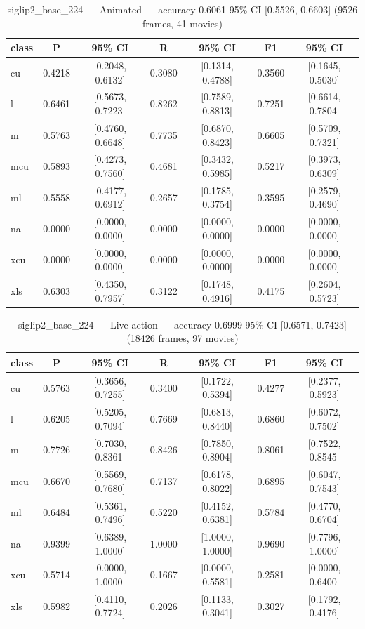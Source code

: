 \begin{table}[htbp]
\centering
\caption{siglip2\_base\_224 — Animated — accuracy 0.6061 95\% CI [0.5526, 0.6603] (9526 frames, 41 movies)}
\label{tab:siglip2-base-224-animated}
\begin{tabular}{lcccccc}
\toprule
class & P & 95\% CI & R & 95\% CI & F1 & 95\% CI \\
\midrule
cu & 0.4218 & [0.2048, 0.6132] & 0.3080 & [0.1314, 0.4788] & 0.3560 & [0.1645, 0.5030] \\
l & 0.6461 & [0.5673, 0.7223] & 0.8262 & [0.7589, 0.8813] & 0.7251 & [0.6614, 0.7804] \\
m & 0.5763 & [0.4760, 0.6648] & 0.7735 & [0.6870, 0.8423] & 0.6605 & [0.5709, 0.7321] \\
mcu & 0.5893 & [0.4273, 0.7560] & 0.4681 & [0.3432, 0.5985] & 0.5217 & [0.3973, 0.6309] \\
ml & 0.5558 & [0.4177, 0.6912] & 0.2657 & [0.1785, 0.3754] & 0.3595 & [0.2579, 0.4690] \\
na & 0.0000 & [0.0000, 0.0000] & 0.0000 & [0.0000, 0.0000] & 0.0000 & [0.0000, 0.0000] \\
xcu & 0.0000 & [0.0000, 0.0000] & 0.0000 & [0.0000, 0.0000] & 0.0000 & [0.0000, 0.0000] \\
xls & 0.6303 & [0.4350, 0.7957] & 0.3122 & [0.1748, 0.4916] & 0.4175 & [0.2604, 0.5723] \\
\bottomrule
\end{tabular}
\end{table}

\begin{table}[htbp]
\centering
\caption{siglip2\_base\_224 — Live-action — accuracy 0.6999 95\% CI [0.6571, 0.7423] (18426 frames, 97 movies)}
\label{tab:siglip2-base-224-live-action}
\begin{tabular}{lcccccc}
\toprule
class & P & 95\% CI & R & 95\% CI & F1 & 95\% CI \\
\midrule
cu & 0.5763 & [0.3656, 0.7255] & 0.3400 & [0.1722, 0.5394] & 0.4277 & [0.2377, 0.5923] \\
l & 0.6205 & [0.5205, 0.7094] & 0.7669 & [0.6813, 0.8440] & 0.6860 & [0.6072, 0.7502] \\
m & 0.7726 & [0.7030, 0.8361] & 0.8426 & [0.7850, 0.8904] & 0.8061 & [0.7522, 0.8545] \\
mcu & 0.6670 & [0.5569, 0.7680] & 0.7137 & [0.6178, 0.8022] & 0.6895 & [0.6047, 0.7543] \\
ml & 0.6484 & [0.5361, 0.7496] & 0.5220 & [0.4152, 0.6381] & 0.5784 & [0.4770, 0.6704] \\
na & 0.9399 & [0.6389, 1.0000] & 1.0000 & [1.0000, 1.0000] & 0.9690 & [0.7796, 1.0000] \\
xcu & 0.5714 & [0.0000, 1.0000] & 0.1667 & [0.0000, 0.5581] & 0.2581 & [0.0000, 0.6400] \\
xls & 0.5982 & [0.4110, 0.7724] & 0.2026 & [0.1133, 0.3041] & 0.3027 & [0.1792, 0.4176] \\
\bottomrule
\end{tabular}
\end{table}

